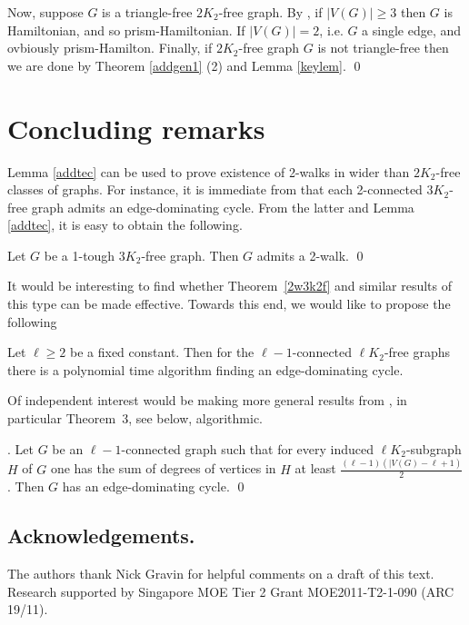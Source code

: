 \documentclass[runningheads,a4paper]{llncs}
\begin{document}
Now, suppose $G$ is a triangle-free $2K_2$-free graph. By \cite[Theorem 4]{broersma2014toughness},
if $|V(G)|\geq 3$ then 
$G$ is Hamiltonian, and so prism-Hamiltonian.
If $|V(G)|=2$, i.e. $G$ a single edge, and ovbiously prism-Hamilton.
Finally, if $2K_2$-free graph $G$ is not triangle-free then we are done by 
Theorem \ref{addgen1} (2) and Lemma \ref{keylem}.
\qed

\section{Concluding remarks}

Lemma \ref{addtec} can be used to prove existence of 2-walks in wider than 
$2K_2$-free classes of graphs.
For instance, it is immediate from \cite[Corollary 3.2]{veldman83} that each 2-connected
$3K_2$-free graph admits  an edge-dominating cycle. From the latter and Lemma \ref{addtec},
it is easy to obtain the following.
\begin{theorem}\label{2w3k2f}
Let $G$ be a 1-tough $3K_2$-free graph. Then $G$ admits a 2-walk. \qed
\end{theorem}

It would be interesting to find whether Theorem~\ref{2w3k2f} and similar results
of this type can be made
effective. Towards this end, we would like to propose the following
\begin{conjecture}
Let $\ell\geq 2$ be a fixed constant. 
Then for the $\ell-1$-connected $\ell K_2$-free
graphs there is a polynomial time algorithm finding an edge-dominating cycle.
\end{conjecture}

Of independent interest would be making more general results from \cite{veldman83}, 
in particular Theorem~3, see below, algorithmic. 
\begin{theorem}
{\rm \cite[Theorem~3]{veldman83}.} Let $G$ be an $\ell-1$-connected graph such that
for every induced $\ell K_2$-subgraph $H$ of $G$ one has the
sum of degrees of vertices in $H$ at least $\frac{(\ell-1)(|V(G)-\ell +1)}{2}$.
Then $G$ has  an edge-dominating cycle. \qed
\end{theorem}

\subsection*{Acknowledgements.}
The authors thank Nick Gravin
for helpful comments on a draft of this text.
Research supported by Singapore MOE Tier 2 Grant MOE2011-T2-1-090 (ARC 19/11). 



%
\end{document}
